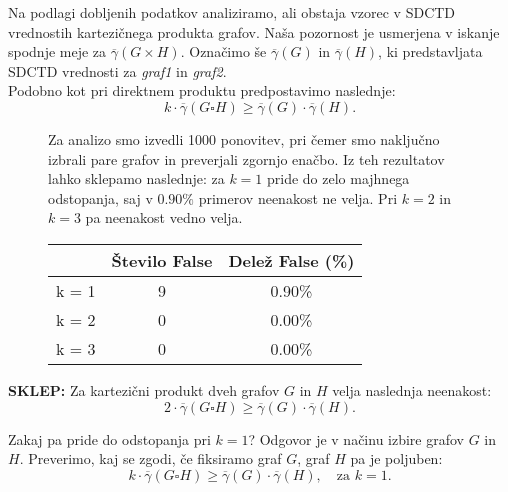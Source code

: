 \documentclass[a4paper, 12pt]{article}
\begin{document}
\noindent Na podlagi dobljenih podatkov analiziramo, ali obstaja vzorec v SDCTD vrednostih kartezičnega produkta grafov. Naša pozornost je usmerjena v iskanje spodnje meje za \(\overline{\gamma}(G \times H)\). Označimo še \(\overline{\gamma}(G)\) in \(\overline{\gamma}(H)\), ki predstavljata SDCTD vrednosti za \textit{graf1} in \textit{graf2}. \\

\noindent Podobno kot pri direktnem produktu predpostavimo naslednje: 
\[
k \cdot \overline{\gamma}(G \square H) \geq \overline{\gamma}(G) \cdot \overline{\gamma}(H).
\]


\begin{figure}[h!]
    \centering
    \begin{minipage}{0.45\textwidth}
        Za analizo smo izvedli 1000 ponovitev, pri čemer smo naključno izbrali pare grafov in preverjali zgornjo enačbo. Iz teh rezultatov lahko sklepamo naslednje: za \(k = 1\) pride do zelo majhnega odstopanja, saj v \(0.90\%\) primerov neenakost ne velja. Pri \(k = 2\) in \(k = 3\) pa neenakost vedno velja. 
    \end{minipage}%
    \hfill
    \begin{minipage}{0.45\textwidth}
        \centering
        \begin{tabular}{@{}lcc@{}}
        \toprule
        \textbf{} & \textbf{Število False} & \textbf{Delež False (\%)} \\ \midrule
        k = 1         & 9                      & 0.90\%                   \\
        k = 2         & 0                      & 0.00\%                   \\
        k = 3         & 0                      & 0.00\%                   \\ \bottomrule
        \end{tabular}

        \label{tab:rezultati}
    \end{minipage}
\end{figure}



\noindent \textbf{SKLEP:} Za kartezični produkt dveh grafov \(G\) in \(H\) velja naslednja neenakost:
\[
2 \cdot \overline{\gamma}(G \square H) \geq \overline{\gamma}(G) \cdot \overline{\gamma}(H).
\]

\vspace{6pt}

\noindent Zakaj pa pride do odstopanja pri \(k = 1\)? Odgovor je v načinu izbire grafov \(G\) in \(H\). Preverimo, kaj se zgodi, če fiksiramo graf \(G\), graf \(H\) pa je poljuben:
\[
k \cdot \overline{\gamma}(G \square H) \geq \overline{\gamma}(G) \cdot \overline{\gamma}(H), \quad \text{za } k = 1.
\]
\end{document}
